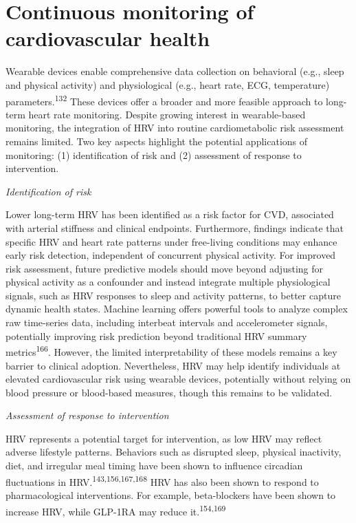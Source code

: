 \documentclass[
  a4paper,
  headsepline=true,
  open=left]{scrbook}
\begin{document}
\hypertarget{continuous-monitoring-of-cardiovascular-health}{%
\section{Continuous monitoring of cardiovascular
health}\label{continuous-monitoring-of-cardiovascular-health}}

Wearable devices enable comprehensive data collection on behavioral
(e.g., sleep and physical activity) and physiological (e.g., heart rate,
ECG, temperature) parameters.\textsuperscript{132} These devices offer a
broader and more feasible approach to long-term heart rate monitoring.
Despite growing interest in wearable-based monitoring, the integration
of HRV into routine cardiometabolic risk assessment remains limited. Two
key aspects highlight the potential applications of monitoring: (1)
identification of risk and (2) assessment of response to intervention.

\emph{Identification of risk}

Lower long-term HRV has been identified as a risk factor for CVD,
associated with arterial stiffness and clinical endpoints. Furthermore,
findings indicate that specific HRV and heart rate patterns under
free-living conditions may enhance early risk detection, independent of
concurrent physical activity. For improved risk assessment, future
predictive models should move beyond adjusting for physical activity as
a confounder and instead integrate multiple physiological signals, such
as HRV responses to sleep and activity patterns, to better capture
dynamic health states. Machine learning offers powerful tools to analyze
complex raw time-series data, including interbeat intervals and
accelerometer signals, potentially improving risk prediction beyond
traditional HRV summary metrics\textsuperscript{166}. However, the
limited interpretability of these models remains a key barrier to
clinical adoption. Nevertheless, HRV may help identify individuals at
elevated cardiovascular risk using wearable devices, potentially without
relying on blood pressure or blood-based measures, though this remains
to be validated.

\emph{Assessment of response to intervention}

HRV represents a potential target for intervention, as low HRV may
reflect adverse lifestyle patterns. Behaviors such as disrupted sleep,
physical inactivity, diet, and irregular meal timing have been shown to
influence circadian fluctuations in
HRV.\textsuperscript{143,156,167,168} HRV has also been shown to respond
to pharmacological interventions. For example, beta-blockers have been
shown to increase HRV, while GLP-1RA may reduce
it.\textsuperscript{154,169}
\end{document}
